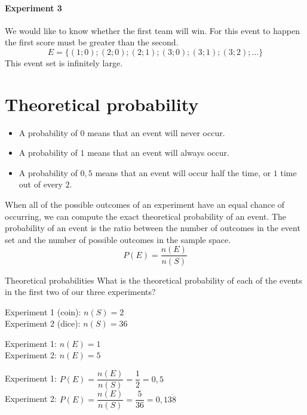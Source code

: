 
\paragraph{Experiment 3} We would like to know whether the first team
will win. For this event to happen the first score must be greater
than the second.
\[E=\{(1;0);(2;0);(2;1);(3;0);(3;1);(3;2);\ldots\}\]
This event set is infinitely large.


\section{Theoretical probability}
\begin{itemize}
\item A probability of $0$ means that an event will never occur.
\item A probability of $1$ means that an event will always occur.
\item A probability of $0,5$ means that an event will occur half the
  time, or $1$ time out of every $2$.
\end{itemize}

When all of the possible outcomes of an experiment have an equal
chance of occurring, we can compute the exact theoretical probability
of an event. The probability of an event is the ratio between the
number of outcomes in the event set and the number of possible
outcomes in the sample space.
\[P(E) = \frac{n(E)}{n(S)}\]


\begin{wex}{Theoretical probabilities}
{What is the theoretical probability of each of the events in the
  first two of our three experiments?}
{

  Experiment 1 (coin): $n(S) = 2$\\
  Experiment 2 (dice): $n(S) = 36$\\


 
   Experiment 1: $n(E) = 1$\\
   Experiment 2: $n(E) = 5$\\




Experiment 1: $P(E) = \dfrac{n(E)}{n(S)} = \dfrac{1}{2} = 0,5$\\
 Experiment 2: $P(E) = \dfrac{n(E)}{n(S)} = \dfrac{5}{36} = 0,13\dot{8}$\\

}
\end{wex}

